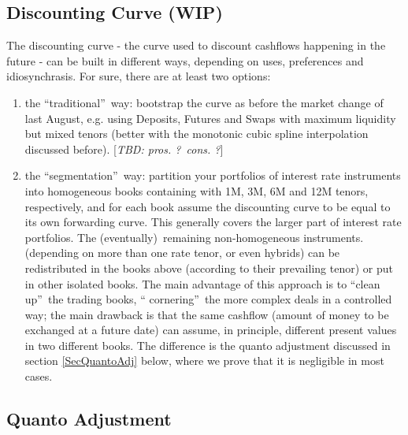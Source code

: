 \documentclass[11pt,reqno]{amsart}
\begin{document}
\subsection{Discounting Curve (WIP)}

The discounting curve - the curve used to discount cashflows happening in
the future - can be built in different ways, depending on uses, preferences
and idiosynchrasis. For sure, there are at least two options:

\begin{enumerate}
\item the \textquotedblleft traditional\textquotedblright\ way: bootstrap
the curve as before the market change of last August, e.g. using Deposits,
Futures and Swaps with maximum liquidity but mixed tenors (better with the
monotonic cubic spline interpolation discussed before). [\textit{TBD: pros.
?\ cons. ?}]

\item the \textquotedblleft segmentation\textquotedblright\ way: partition
your portfolios of interest rate instruments into homogeneous books
containing with 1M, 3M, 6M and 12M tenors, respectively, and for each book
assume the discounting curve to be equal to its own forwarding curve. This
generally covers the larger part of interest rate portfolios. The
(eventually)\ remaining non-homogeneous instruments.(depending on more than
one rate tenor, or even hybrids) can be redistributed in the books above
(according to their prevailing tenor) or put in other isolated books. The
main advantage of this approach is to \textquotedblleft clean
up\textquotedblright\ the trading books, \textquotedblleft
cornering\textquotedblright\ the more complex deals in a controlled way; the
main drawback is that the same cashflow (amount of money to be exchanged at
a future date) can assume, in principle, different present values in two
different books. The difference is the quanto adjustment discussed in
section \ref{SecQuantoAdj} below, where we prove that it is negligible in
most cases.
\end{enumerate}

\subsection{Quanto Adjustment}
\end{document}
